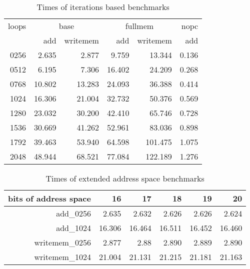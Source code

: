 \begin{table}
    \centering
    \begin{tabular}{r|rr|rr|r}
        loops & \multicolumn{2}{c|}{base} & \multicolumn{2}{c|}{fullmem} & nopc                      \\
              & add                       & writemem                     & add    & writemem & add   \\ \hline
        0256  & 2.635                     & 2.877                        & 9.759  & 13.344   & 0.136 \\
        0512  & 6.195                     & 7.306                        & 16.402 & 24.209   & 0.268 \\
        0768  & 10.802                    & 13.283                       & 24.093 & 36.388   & 0.414 \\
        1024  & 16.306                    & 21.004                       & 32.732 & 50.376   & 0.569 \\
        1280  & 23.032                    & 30.200                       & 42.410 & 65.746   & 0.728 \\
        1536  & 30.669                    & 41.262                       & 52.961 & 83.036   & 0.898 \\
        1792  & 39.463                    & 53.940                       & 64.598 & 101.475  & 1.075 \\
        2048  & 48.944                    & 68.521                       & 77.084 & 122.189  & 1.276 \\
    \end{tabular}
    \caption{Times of iterations based benchmarks}\label{tab:time_iter}
\end{table}

\begin{table}
    \centering
    \begin{tabular}{r|rrrrr}
        bits of address space & 16     & 17     & 18     & 19     & 20     \\\hline
        add\_0256             & 2.635  & 2.632  & 2.626  & 2.626  & 2.624  \\
        add\_1024             & 16.306 & 16.464 & 16.511 & 16.452 & 16.460 \\

        writemem\_0256        & 2.877  & 2.88   & 2.890  & 2.889  & 2.890  \\
        writemem\_1024        & 21.004 & 21.131 & 21.215 & 21.181 & 21.163 \\

    \end{tabular}
    \caption{Times of extended address space benchmarks}\label{tab:time_extaddr}
\end{table}

